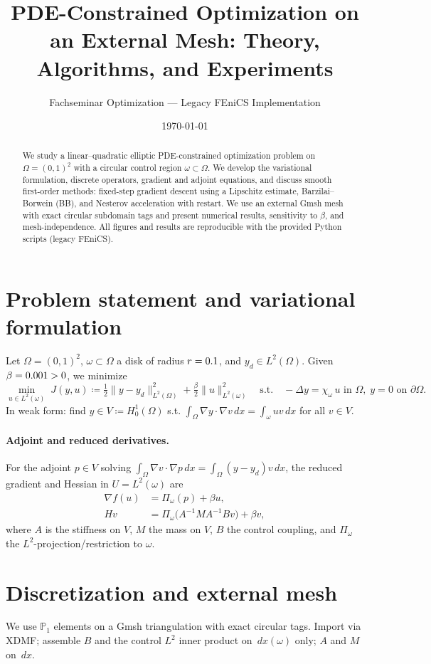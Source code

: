 \documentclass[11pt,a4paper]{article}
\title{PDE-Constrained Optimization on an External Mesh: Theory, Algorithms, and Experiments}
\author{Fachseminar Optimization — Legacy FEniCS Implementation}
\date{\today}
\newcommand{\Om}{\Omega}
\newcommand{\w}{\omega}
\newcommand{\dx}{\,dx}
\begin{document}
\maketitle

\begin{abstract}
We study a linear--quadratic elliptic PDE-constrained optimization problem on $\Om=(0,1)^2$ with a circular control region $\w\subset\Om$. We develop the variational formulation, discrete operators, gradient and adjoint equations, and discuss smooth first-order methods: fixed-step gradient descent using a Lipschitz estimate, Barzilai--Borwein (BB), and Nesterov acceleration with restart. We use an external Gmsh mesh with exact circular subdomain tags and present numerical results, sensitivity to $\beta$, and mesh-independence. All figures and results are reproducible with the provided Python scripts (legacy FEniCS).
\end{abstract}

\section{Problem statement and variational formulation}
Let $\Om=(0,1)^2$, $\w \subset \Om$ a disk of radius $r=0.1$, and $y_d\in L^2(\Om)$. Given $\beta=0.001>0$, we minimize
\begin{equation}
\min_{u \in L^2(\w)}\; J(y,u) \coloneqq \tfrac12 \|y-y_d\|_{L^2(\Om)}^2 + \tfrac\beta2 \|u\|_{L^2(\w)}^2
\quad\text{s.t.}\quad -\Delta y = \chi_{\w}\,u \text{ in }\Om,\; y=0 \text{ on }\partial\Om.
\end{equation}
In weak form: find $y\in V\coloneqq H_0^1(\Om)$ s.t. $\int_\Om \nabla y\cdot\nabla v\,dx=\int_{\w}u v\,dx$ for all $v\in V$.

\paragraph{Adjoint and reduced derivatives.}
For the adjoint $p\in V$ solving $\int_\Om \nabla v\cdot\nabla p\,dx=\int_\Om (y-y_d)v\,dx$, the reduced gradient and Hessian in $U=L^2(\w)$ are
\begin{align}
 \nabla f(u) &= \Pi_{\w}(p) + \beta u,\\
 H v &= \Pi_{\w}\big( A^{-1} M A^{-1} B v\big) + \beta v,
\end{align}
where $A$ is the stiffness on $V$, $M$ the mass on $V$, $B$ the control coupling, and $\Pi_\w$ the $L^2$-projection/restriction to $\w$.

\section{Discretization and external mesh}
We use $\mathbb{P}_1$ elements on a Gmsh triangulation with exact circular tags. Import via XDMF; assemble $B$ and the control $L^2$ inner product on $\dx(\w)$ only; $A$ and $M$ on $\dx$.
\end{document}
